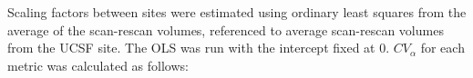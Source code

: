 Scaling factors between sites were estimated using ordinary least squares from the average of the scan-rescan volumes, referenced to average scan-rescan volumes from the UCSF site. The OLS was run with the intercept fixed at 0. $CV_\alpha$ for each metric was calculated as follows: %